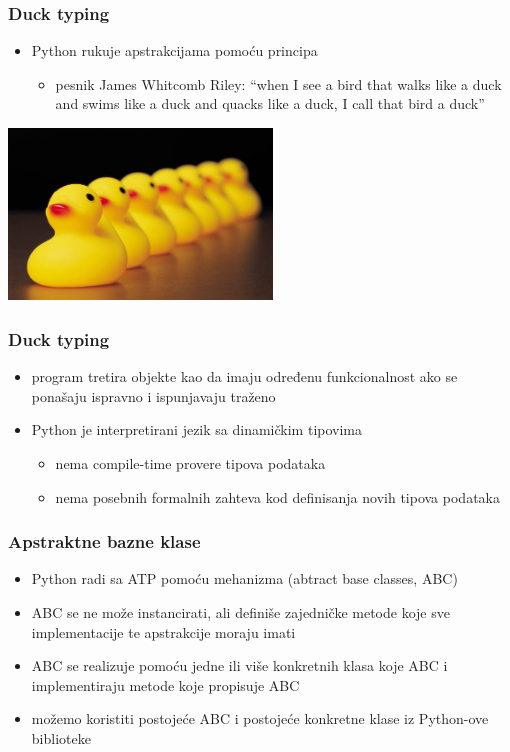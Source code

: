 \documentclass[compress]{beamer}
\begin{document}
\begin{frame}[fragile]
  \frametitle{Duck typing}
  \begin{itemize}
    \item Python rukuje apstrakcijama pomoću  principa
    \begin{itemize}
      \item pesnik James Whitcomb Riley: ``when I see a bird that walks like a duck and swims like a duck and quacks like a duck, I call that bird a duck''
    \end{itemize}
  \end{itemize}
  \begin{center}
    \includegraphics[width=7cm]{asp-03-pic02.png}
  \end{center}
\end{frame}

\begin{frame}[fragile]
  \frametitle{Duck typing}
  \begin{itemize}
    \item program tretira objekte kao da imaju određenu funkcionalnost ako se ponašaju ispravno i ispunjavaju traženo
    \item Python je interpretirani jezik sa dinamičkim tipovima
    \begin{itemize}
      \item nema compile-time provere tipova podataka
      \item nema posebnih formalnih zahteva kod definisanja novih tipova podataka
    \end{itemize}
  \end{itemize}
\end{frame}

\begin{frame}[fragile]
  \frametitle{Apstraktne bazne klase}
  \begin{itemize}
    \item Python radi sa ATP pomoću mehanizma  (abtract base classes, ABC)
    \item ABC se ne može instancirati, ali definiše zajedničke metode koje sve implementacije te apstrakcije moraju imati
    \item ABC se realizuje pomoću jedne ili više konkretnih klasa koje  ABC i implementiraju metode koje propisuje ABC
    \item možemo koristiti postojeće ABC i postojeće konkretne klase iz Python-ove biblioteke 
  \end{itemize}
\end{frame}
\end{document}

